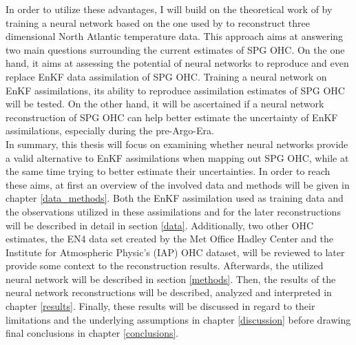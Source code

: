 \documentclass[Masterarbeit.tex]{subfile}
\begin{document}
	In order to utilize these advantages, I will build on the theoretical work of \cite{arcucci_deep_2021} by training a neural network based on the one used by \cite{kadow_artificial_2020} to reconstruct three dimensional North Atlantic temperature data. This approach aims at answering two main questions surrounding the current estimates of SPG OHC. On the one hand, it aims at assessing the potential of neural networks to reproduce and even replace EnKF data assimilation of SPG OHC. Training a neural network on EnKF assimilations, its ability to reproduce assimilation estimates of SPG OHC will be tested. On the other hand, it will be ascertained if a neural network reconstruction of SPG OHC can help better estimate the uncertainty of EnKF assimilations, especially during the pre-Argo-Era. \\
	
	In summary, this thesis will focus on examining whether neural networks provide a valid alternative to EnKF assimilations when mapping out SPG OHC, while at the same time trying to better estimate their uncertainties. In order to reach these aims, at first an overview of the involved data and methods will be given in chapter \ref{data_methods}. Both the EnKF assimilation used as training data and the observations utilized in these assimilations and for the later reconstructions will be described in detail in section \ref{data}. Additionally, two other OHC estimates, the EN4 data set created by the Met Office Hadley Center and the Institute for Atmospheric Physic's (IAP) OHC dataset, will be reviewed to later provide some context to the reconstruction results. Afterwards, the utilized neural network will be described in section \ref{methods}. Then, the results of the neural network reconstructions will be described, analyzed and interpreted in chapter \ref{results}. Finally, these results will be discussed in regard to their limitations and the underlying assumptions in chapter \ref{discussion} before drawing final conclusions in chapter \ref{conclusions}. \\
	
\end{document}
